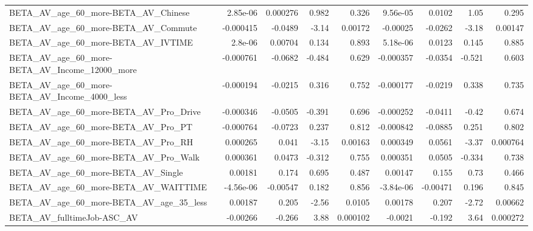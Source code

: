 \begin{tabular}{lrrrrrrrr}
BETA\_AV\_age\_60\_more-BETA\_AV\_Chinese                &    2.85e-06 &     0.000276 &     0.982 &    0.326 &   9.56e-05 &      0.0102 &         1.05 &         0.295 \\
BETA\_AV\_age\_60\_more-BETA\_AV\_Commute                &   -0.000415 &      -0.0489 &     -3.14 &  0.00172 &   -0.00025 &     -0.0262 &        -3.18 &       0.00147 \\
BETA\_AV\_age\_60\_more-BETA\_AV\_IVTIME                 &     2.8e-06 &      0.00704 &     0.134 &    0.893 &   5.18e-06 &      0.0123 &        0.145 &         0.885 \\
BETA\_AV\_age\_60\_more-BETA\_AV\_Income\_12000\_more      &   -0.000761 &      -0.0682 &    -0.484 &    0.629 &  -0.000357 &     -0.0354 &       -0.521 &         0.603 \\
BETA\_AV\_age\_60\_more-BETA\_AV\_Income\_4000\_less       &   -0.000194 &      -0.0215 &     0.316 &    0.752 &  -0.000177 &     -0.0219 &        0.338 &         0.735 \\
BETA\_AV\_age\_60\_more-BETA\_AV\_Pro\_Drive              &   -0.000346 &      -0.0505 &    -0.391 &    0.696 &  -0.000252 &     -0.0411 &        -0.42 &         0.674 \\
BETA\_AV\_age\_60\_more-BETA\_AV\_Pro\_PT                 &   -0.000764 &      -0.0723 &     0.237 &    0.812 &  -0.000842 &     -0.0885 &        0.251 &         0.802 \\
BETA\_AV\_age\_60\_more-BETA\_AV\_Pro\_RH                 &    0.000265 &        0.041 &     -3.15 &  0.00163 &   0.000349 &      0.0561 &        -3.37 &      0.000764 \\
BETA\_AV\_age\_60\_more-BETA\_AV\_Pro\_Walk               &    0.000361 &       0.0473 &    -0.312 &    0.755 &   0.000351 &      0.0505 &       -0.334 &         0.738 \\
BETA\_AV\_age\_60\_more-BETA\_AV\_Single                 &     0.00181 &        0.174 &     0.695 &    0.487 &    0.00147 &       0.155 &         0.73 &         0.466 \\
BETA\_AV\_age\_60\_more-BETA\_AV\_WAITTIME               &   -4.56e-06 &     -0.00547 &     0.182 &    0.856 &  -3.84e-06 &    -0.00471 &        0.196 &         0.845 \\
BETA\_AV\_age\_60\_more-BETA\_AV\_age\_35\_less            &     0.00187 &        0.205 &     -2.56 &   0.0105 &    0.00178 &       0.207 &        -2.72 &       0.00662 \\
BETA\_AV\_fulltimeJob-ASC\_AV                         &    -0.00266 &       -0.266 &      3.88 & 0.000102 &    -0.0021 &      -0.192 &         3.64 &      0.000272 \\

\end{tabular}
